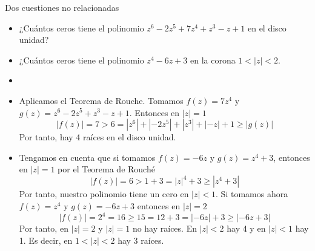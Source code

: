 \documentclass[twoside]{article}
\begin{document}
\begin{ejercicio}{2}
Dos cuestiones no relacionadas
\begin{itemize}
\item ¿Cuántos ceros tiene el polinomio $z^6-2z^5 +7z^4+z^3-z+1$ en el disco unidad?
\item ¿Cuántos ceros tiene el polinomio $z^4-6z+3$ en la corona $1<|z|<2$.
\end{itemize}
\end{ejercicio}
\begin{solucion}
\begin{itemize}
\item[]
\item Aplicamos el Teorema de Rouche. Tomamos $f(z)=7z^4$ y $g(z)=z^6-2z^5+z^3-z+1$. Entonces en $|z|=1$
$$
|f(z)| = 7 > 6 = |z^6| + |-2z^5| + |z^3| + |-z| +1 \geq |g(z)|
$$
Por tanto, hay 4 raíces en el disco unidad.
\item  Tengamos en cuenta que si tomamos $f(z)=-6z$ y $g(z)=z^4+3$, entonces en $|z|=1$ por el Teorema de Rouché
$$
|f(z)| = 6 > 1+3 = |z|^4+ 3 \geq |z^4+3|
$$
Por tanto, nuestro polinomio tiene un cero en $|z|<1$. Si tomamos ahora $f(z)=z^4$ y $g(z)=-6z+3$ entonces en $|z|=2$
$$
|f(z)| = 2^4 = 16 \geq 15 = 12 + 3 = |-6z| + 3 \geq |-6z+3|
$$
Por tanto, en $|z|=2$ y $|z|=1$ no hay raíces. En $|z|<2$ hay 4 y en $|z|<1$ hay 1. Es decir, en $1<|z|<2$ hay 3 raíces.
\end{itemize}
\end{solucion}
\newpage
\end{document}

